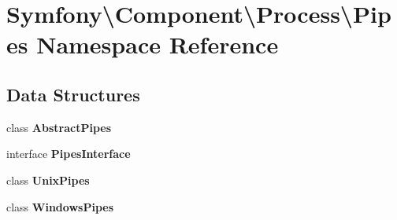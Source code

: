 \section{Symfony\textbackslash{}Component\textbackslash{}Process\textbackslash{}Pipes Namespace Reference}
\label{namespace_symfony_1_1_component_1_1_process_1_1_pipes}
\subsection*{Data Structures}
\begin{DoxyCompactItemize}
\item 
class {\bf Abstract\+Pipes}
\item 
interface {\bf Pipes\+Interface}
\item 
class {\bf Unix\+Pipes}
\item 
class {\bf Windows\+Pipes}
\end{DoxyCompactItemize}
